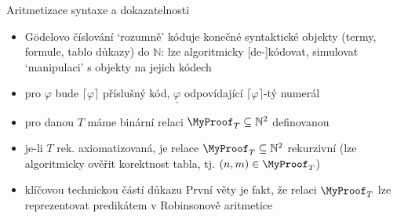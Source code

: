 \documentclass{beamer}
\begin{document}
\begin{frame}{Aritmetizace syntaxe a dokazatelnosti}
    
    \begin{itemize}[<+->]
        \item \alert{Gödelovo číslování} `rozumně' kóduje konečné syntaktické objekty (termy, formule, tablo důkazy) do $\mathbb N$: lze algoritmicky [de-]kódovat, simulovat `manipulaci' s objekty na jejich kódech
        \item pro $\varphi$ bude \alert{$\lceil\varphi\rceil$} příslušný kód, \alert{$\underline{\varphi}$} odpovídající $\lceil\varphi\rceil$-tý numerál
        \item pro danou $T$ máme binární relaci $\MyProof_T\subseteq\mathbb N^2$ definovanou
        \hspace{-1cm}
        \item je-li $T$ rek. axiomatizovaná, je relace $\MyProof_T\subseteq\mathbb N^2$ \alert{rekurzivní} (lze algoritmicky ověřit korektnost tabla, tj. $(n,m)\in\MyProof_T$)
        \item klíčovou technickou částí důkazu První věty je fakt, že relaci $\MyProof_T$ lze \alert{reprezentovat} predikátem v Robinsonově aritmetice

    \end{itemize}    

\end{frame}
\end{document}
